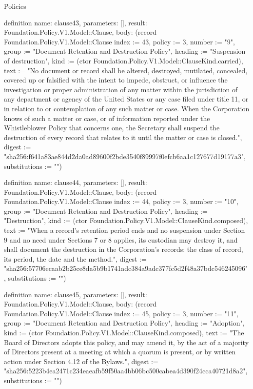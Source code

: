 \begin{lexlean}{Policies}
\begin{semanticmodule}
definition{
  name: clause43,
  parameters: [],
  result: Foundation.Policy.V1.Model::Clause,
  body: (record Foundation.Policy.V1.Model::Clause {index := 43, policy := 3, number := "9", group := "Document Retention and Destruction Policy", heading := "Suspension of destruction", kind := (ctor Foundation.Policy.V1.Model::ClauseKind.carried), text := "No document or record shall be altered, destroyed, mutilated, concealed, covered up or falsified with the intent to impede, obstruct, or influence the investigation or proper administration of any matter within the jurisdiction of any department or agency of the United States or any case filed under title 11, or in relation to or contemplation of any such matter or case. When the Corporation knows of such a matter or case, or of information reported under the Whistleblower Policy that concerns one, the Secretary shall suspend the destruction of every record that relates to it until the matter or case is closed.", digest := "sha256:f641a83ae844d2da0ad89600f2bde3540f89997f0efcb6aa1c127677d19177a3", substitutions := ""})
}

definition{
  name: clause44,
  parameters: [],
  result: Foundation.Policy.V1.Model::Clause,
  body: (record Foundation.Policy.V1.Model::Clause {index := 44, policy := 3, number := "10", group := "Document Retention and Destruction Policy", heading := "Destruction", kind := (ctor Foundation.Policy.V1.Model::ClauseKind.composed), text := "When a record's retention period ends and no suspension under Section 9 and no need under Sections 7 or 8 applies, its custodian may destroy it, and shall document the destruction in the Corporation's records: the class of record, its period, the date and the method.", digest := "sha256:57706ecaab2b25ce8da5b9b1741adc384a9adc377fc5d2f48a37bdc546245096", substitutions := ""})
}

definition{
  name: clause45,
  parameters: [],
  result: Foundation.Policy.V1.Model::Clause,
  body: (record Foundation.Policy.V1.Model::Clause {index := 45, policy := 3, number := "11", group := "Document Retention and Destruction Policy", heading := "Adoption", kind := (ctor Foundation.Policy.V1.Model::ClauseKind.composed), text := "The Board of Directors adopts this policy, and may amend it, by the act of a majority of Directors present at a meeting at which a quorum is present, or by written action under Section 4.12 of the Bylaws.", digest := "sha256:5223b4ea2471c234eaeafb59f50aa4bb06bc500cabea4d390f24cca40721d8a2", substitutions := ""})
}


\end{semanticmodule}
\end{lexlean}
